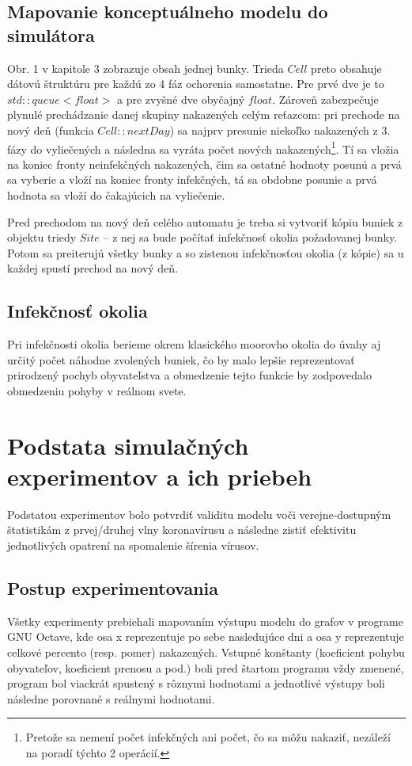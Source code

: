 \documentclass[12pt,a4paper,titlepage]{article}
\begin{document}
\subsection{Mapovanie konceptuálneho modelu do simulátora}
Obr. 1 v kapitole 3 zobrazuje obsah jednej bunky. Trieda \(Cell\) preto obsahuje dátovú štruktúru pre každú zo 4 fáz ochorenia samostatne. Pre prvé dve je to \(std::queue<float>\) a pre zvyšné dve obyčajný \(float\). Zároveň zabezpečuje plynulé prechádzanie danej skupiny nakazených celým reťazcom: pri prechode na nový deň (funkcia \(Cell::nextDay\)) sa najprv presunie niekoľko nakazených z 3. fázy do vyliečených a následna sa vyráta počet nových nakazených\footnote{Pretože sa nemení počet infekčných ani počet, čo sa môžu nakaziť, nezáleží na poradí týchto 2 operácií.}. Tí sa vložia na koniec fronty neinfekčných nakazených, čim sa ostatné hodnoty posunú a prvá sa vyberie a vloží na koniec fronty infekčných, tá sa obdobne posunie a prvá hodnota sa vloží do čakajúcich na vyliečenie.

Pred prechodom na nový deň celého automatu je treba si vytvoriť kópiu buniek z objektu triedy \(Site\) – z nej sa bude počítať infekčnosť okolia požadovanej bunky. Potom sa preiterujú všetky bunky a so zistenou infekčnosťou okolia (z kópie) sa u každej spustí prechod na nový deň.

\subsection{Infekčnosť okolia}
Pri infekčnosti okolia berieme okrem klasického moorovho okolia do úvahy aj určitý počet náhodne zvolených buniek, čo by malo lepšie reprezentovať prirodzený pochyb obyvateľstva a obmedzenie tejto funkcie by zodpovedalo obmedzeniu pohyby v reálnom svete.

\section{Podstata simulačných experimentov a ich priebeh}
Podstatou experimentov bolo potvrdiť validitu modelu voči verejne-dostupným štatistikám z prvej/druhej vlny koronavírusu a následne zistiť efektivitu jednotlivých opatrení na spomalenie šírenia vírusov.

\subsection{Postup experimentovania}
Všetky experimenty prebiehali mapovaním výstupu modelu do grafov v programe GNU Octave, kde osa x reprezentuje po sebe nasledujúce dni a osa y reprezentuje celkové percento (resp. pomer) nakazených. Vstupné konštanty (koeficient pohybu obyvateľov, koeficient prenosu a pod.) boli pred štartom programu vždy zmenené, program bol viackrát spustený s rôznymi hodnotami a jednotlivé výstupy boli následne porovnané s reálnymi hodnotami.
\end{document}
